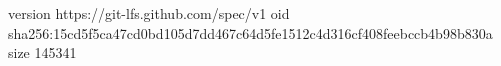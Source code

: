 version https://git-lfs.github.com/spec/v1
oid sha256:15cd5f5ca47cd0bd105d7dd467c64d5fe1512c4d316cf408feebccb4b98b830a
size 145341
